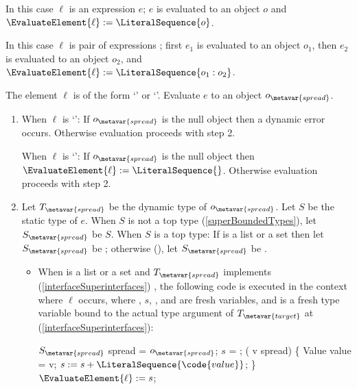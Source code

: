 \documentclass[makeidx]{article}
\begin{document}
{\LMHash{}%
In this case $\ell$ is an expression $e$;
$e$ is evaluated to an object $o$
and $\EvaluateElement{\ell} := \LiteralSequence{o}$.
\EndCase

\LMHash{}%
In this case $\ell$ is pair of expressions
;
first $e_1$ is evaluated to an object $o_1$,
then $e_2$ is evaluated to an object $o_2$,
and $\EvaluateElement{\ell} := \LiteralSequence{o_1:o_2}$.
\EndCase

\LMHash{}%
The element $\ell$ is of the form `' or `'.
Evaluate $e$ to an object $o_{\metavar{spread}}$.
\begin{enumerate}
\item
  When $\ell$ is `':
  If $o_{\metavar{spread}}$ is the null object then a dynamic error occurs.
  Otherwise evaluation proceeds with step 2.

  When $\ell$ is `':
  If $o_{\metavar{spread}}$ is the null object then
  $\EvaluateElement{\ell} := \LiteralSequence{}$.
  Otherwise evaluation proceeds with step 2.
\item
  Let $T_{\metavar{spread}}$ be the dynamic type of $o_{\metavar{spread}}$.
  Let $S$ be the static type of $e$.
  When $S$ is not a top type
  (\ref{superBoundedTypes}),
  let $S_{\metavar{spread}}$ be $S$.
  When $S$ is a top type:
  If  is a list or a set then
  let $S_{\metavar{spread}}$ be ;
  otherwise
  (),
  let $S_{\metavar{spread}}$ be .

  \begin{itemize}
  \item
    When  is a list or a set
    and $T_{\metavar{spread}}$ implements
    (\ref{interfaceSuperinterfaces})
    ,
    the following code is executed in the context where $\ell$ occurs,
    where , $s$, , and  are fresh variables,
    and  is a fresh type variable bound to the
    actual type argument of $T_{\metavar{target}}$ at 
    (\ref{interfaceSuperinterfaces}):

    \vspace{-2ex}\begin{minipage}[t]{\textwidth}
\begin{normativeDartCode}
$S_{\metavar{spread}}$ spread = $o_{\metavar{spread}}$;
\VAR{} $s$ = \LiteralSequence;
\FOR{} (\VAR{} v \IN{} spread) \{
  Value value = v;
  $s := s + \LiteralSequence{\code{value}}$;
\}
$\EvaluateElement{\ell} := s$;
\end{normativeDartCode}
    \end{minipage}


\end{itemize}
\end{enumerate}}
\end{document}
